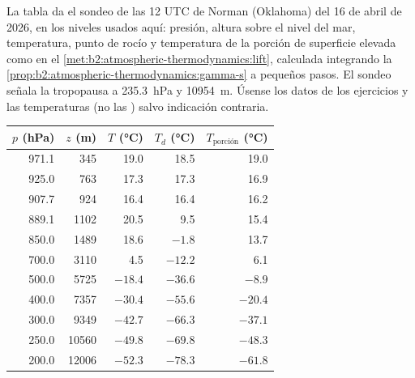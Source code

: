 \begin{problem}\label{pb:b2:atmospheric-thermodynamics:1}
La tabla da el sondeo de las 12 UTC de Norman (Oklahoma) del 16 de abril de 2026, en los niveles usados
aquí: presión, altura sobre el nivel del mar, temperatura, punto de rocío y temperatura de la
porción de superficie elevada como en el \cref{met:b2:atmospheric-thermodynamics:lift}, calculada
integrando la \cref{prop:b2:atmospheric-thermodynamics:gamma-s} a pequeños pasos. El sondeo
señala la tropopausa a \qty{235.3}{hPa} y \qty{10954}{m}. Úsense los datos de los ejercicios y
las temperaturas (no las ) salvo indicación contraria.

\begin{center}
\small
\begin{tabular}{rrrrr}
\hline
$p$ (\unit{hPa}) & $z$ (\unit{m}) & $T$ (\unit{\celsius}) & $T_d$ (\unit{\celsius}) &
$T_{\text{porción}}$ (\unit{\celsius}) \\
\hline
971.1 & 345 & 19.0 & 18.5 & 19.0 \\
925.0 & 763 & 17.3 & 17.3 & 16.9 \\
907.7 & 924 & 16.4 & 16.4 & 16.2 \\
889.1 & 1102 & 20.5 & 9.5 & 15.4 \\
850.0 & 1489 & 18.6 & $-1.8$ & 13.7 \\
700.0 & 3110 & 4.5 & $-12.2$ & 6.1 \\
500.0 & 5725 & $-18.4$ & $-36.6$ & $-8.9$ \\
400.0 & 7357 & $-30.4$ & $-55.6$ & $-20.4$ \\
300.0 & 9349 & $-42.7$ & $-66.3$ & $-37.1$ \\
250.0 & 10560 & $-49.8$ & $-69.8$ & $-48.3$ \\
200.0 & 12006 & $-52.3$ & $-78.3$ & $-61.8$ \\
\hline
\end{tabular}
\end{center}


\end{problem}

